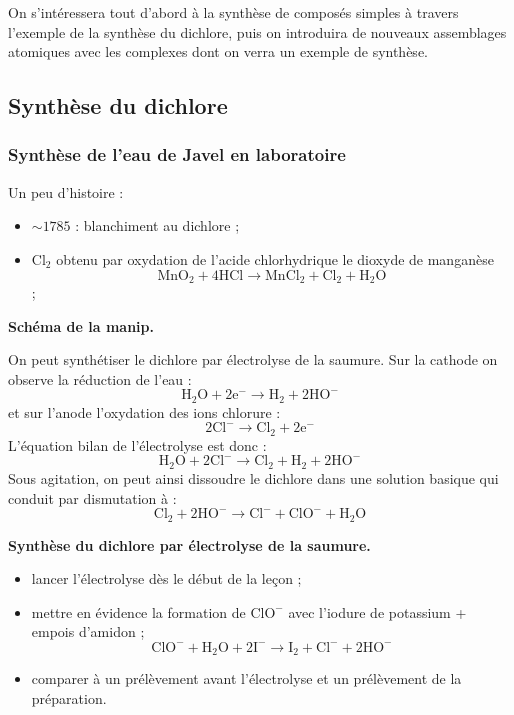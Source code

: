 On s'intéressera tout d'abord à la synthèse de composés simples à travers l'exemple de la synthèse du dichlore, puis on introduira de nouveaux assemblages atomiques avec les complexes dont on verra un exemple de synthèse.

\subsection{Synthèse du dichlore}

\subsubsection{Synthèse de l'eau de Javel en laboratoire}

Un peu d'histoire :
\begin{itemize}
\item $\sim 1785$ : blanchiment au dichlore ;
\item $\mathrm{Cl_2}$ obtenu par oxydation de l'acide chlorhydrique le dioxyde de manganèse $$\mathrm{MnO_2 + 4HCl \rightarrow MnCl_2 + Cl_2 + H_2O}$$;
\end{itemize} 

\begin{slide}
\textbf{Schéma de la manip.}
\end{slide}

On peut synthétiser le dichlore par électrolyse de la saumure.
Sur la cathode on observe la réduction de l'eau :
\begin{equation*}
\mathrm{H_2O + 2e^- \rightarrow H_2 + 2HO^-}
\end{equation*}
et sur l'anode l'oxydation des ions chlorure :
\begin{equation*}
\mathrm{2Cl^- \rightarrow Cl_2 + 2e^-}
\end{equation*}
L'équation bilan de l'électrolyse est donc :
\begin{equation*}
\mathrm{H_2O + 2Cl^- \rightarrow Cl_2 + H_2 + 2HO^-}
\end{equation*}
Sous agitation, on peut ainsi dissoudre le dichlore dans une solution basique qui conduit par dismutation à :
\begin{equation*}
\mathrm{Cl_2 + 2HO^- \rightarrow Cl^- + ClO^- + H_2O} 
\end{equation*}

\begin{experience}
\textbf{Synthèse du dichlore par électrolyse de la saumure.}
\begin{itemize}
\item lancer l'électrolyse dès le début de la leçon ;
\item mettre en évidence la formation de $\mathrm{ClO^-}$ avec l'iodure de potassium + empois d'amidon ;
\begin{equation*}
\mathrm{ClO^- + H_2O + 2I^- \rightarrow I_2 + Cl^- + 2HO^-} 
\end{equation*}
\item comparer à un prélèvement avant l'électrolyse et un prélèvement de la préparation.
\end{itemize}
\end{experience}

